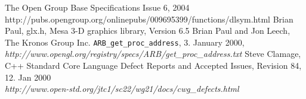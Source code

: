 \documentclass[12pt]{article}
\begin{document}
\begin{thebibliography}{9}
 The Open Group Base Specifications Issue 6, 2004\\
 http://pubs.opengroup.org/onlinepubs/009695399/functions/dlsym.html
  Brian Paul, glx.h, Mesa 3-D graphics library, Version 6.5
 Brian Paul and Jon Leech, The Kronos Group Inc.
  \texttt{ARB\_get\_proc\_address}, 3. January 2000,
  \textit{http://www.opengl.org/registry/specs/ARB/get\_proc\_address.txt}
  Steve Clamage, C++ Standard Core Language Defect Reports and Accepted Issues, Revision 84, 12. Jan 2000\\
  \textit{http://www.open-std.org/jtc1/sc22/wg21/docs/cwg\_defects.html}
\end{thebibliography}
\end{document}
